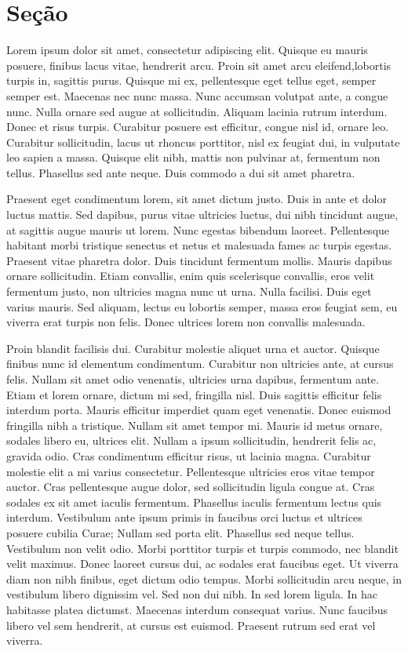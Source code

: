 \documentclass{article}
\begin{document}
	\section{Seção}
	
	\doublespacing
	Lorem ipsum dolor sit amet, consectetur adipiscing elit. Quisque eu
	mauris posuere, finibus lacus vitae, hendrerit arcu. Proin sit amet arcu eleifend,lobortis turpis in, sagittis purus. Quisque mi ex, pellentesque eget tellus eget, semper semper est. Maecenas nec nunc massa. Nunc accumsan volutpat ante, a congue nunc. Nulla ornare sed augue at sollicitudin. Aliquam lacinia rutrum interdum. Donec et risus turpis. Curabitur posuere est efficitur, congue nisl id, ornare leo. Curabitur sollicitudin, lacus ut rhoncus porttitor, nisl ex feugiat dui, in vulputate leo sapien a massa. Quisque elit nibh, mattis non pulvinar at, fermentum non tellus. Phasellus sed ante neque. Duis commodo a dui sit amet pharetra.
	
	Praesent eget condimentum lorem, sit amet dictum justo. Duis in ante
	et dolor luctus mattis. Sed dapibus, purus vitae ultricies luctus, dui nibh tincidunt augue, at sagittis augue mauris ut lorem. Nunc egestas bibendum laoreet. Pellentesque habitant morbi tristique senectus et netus et malesuada fames ac turpis egestas. Praesent vitae pharetra dolor. Duis tincidunt fermentum mollis. Mauris dapibus ornare sollicitudin. Etiam convallis, enim quis scelerisque convallis, eros velit fermentum justo, non ultricies magna nunc ut urna. Nulla facilisi. Duis eget varius mauris. Sed aliquam, lectus eu lobortis semper, massa eros feugiat sem, eu viverra erat turpis non felis. Donec ultrices lorem non convallis malesuada.
	
	Proin blandit facilisis dui. Curabitur molestie aliquet urna et auctor.
	Quisque finibus nunc id elementum condimentum. Curabitur non ultricies ante,
	at cursus felis. Nullam sit amet odio venenatis, ultricies urna dapibus, fermentum ante. Etiam et lorem ornare, dictum mi sed, fringilla nisl. Duis sagittis
	efficitur felis interdum porta. Mauris efficitur imperdiet quam eget venenatis.
	Donec euismod fringilla nibh a tristique.
	Nullam sit amet tempor mi. Mauris id metus ornare, sodales libero
	eu, ultrices elit. Nullam a ipsum sollicitudin, hendrerit felis ac, gravida odio.
	Cras condimentum efficitur risus, ut lacinia magna. Curabitur molestie elit a
	mi varius consectetur. Pellentesque ultricies eros vitae tempor auctor. Cras
	pellentesque augue dolor, sed sollicitudin ligula congue at. Cras sodales ex
	sit amet iaculis fermentum. Phasellus iaculis fermentum lectus quis interdum.
	Vestibulum ante ipsum primis in faucibus orci luctus et ultrices posuere cubilia
	Curae; Nullam sed porta elit.
	Phasellus sed neque tellus. Vestibulum non velit odio. Morbi porttitor
	turpis et turpis commodo, nec blandit velit maximus. Donec laoreet cursus dui,
	ac sodales erat faucibus eget. Ut viverra diam non nibh finibus, eget dictum odio
	tempus. Morbi sollicitudin arcu neque, in vestibulum libero dignissim vel. Sed
	non dui nibh. In sed lorem ligula. In hac habitasse platea dictumst. Maecenas
	interdum consequat varius. Nunc faucibus libero vel sem hendrerit, at cursus
	est euismod. Praesent rutrum sed erat vel viverra.
\end{document}
